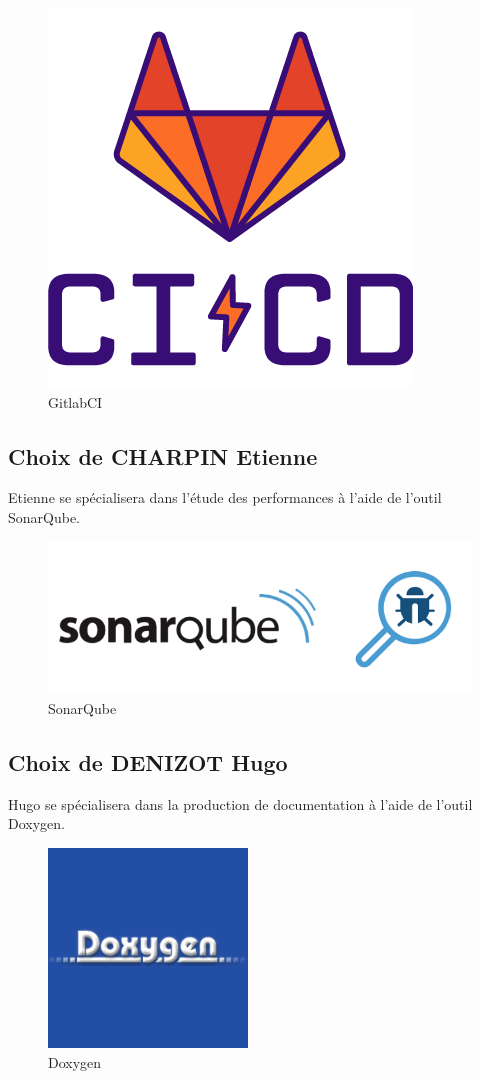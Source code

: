 \documentclass[12pt,french]{article} %
\begin{document}
\begin{figure}[H]
	\centering
	\includegraphics[scale=0.35]{clilian.png}
	\caption{GitlabCI}    
\end{figure}



\subsection{Choix de CHARPIN Etienne}

Etienne se spécialisera dans l'étude des performances à l'aide de l'outil SonarQube.

\begin{figure}[H]
	\centering
	\includegraphics[scale=0.35]{cetienne.png}
	\caption{SonarQube}    
\end{figure}


\subsection{Choix de DENIZOT Hugo}

Hugo se spécialisera dans la production de documentation à l'aide de l'outil Doxygen.

\begin{figure}[H]
	\centering
	\includegraphics[scale=0.35]{chugo.png}
	\caption{Doxygen}    
\end{figure}


\bigskip


\listoffigures
\end{document}
